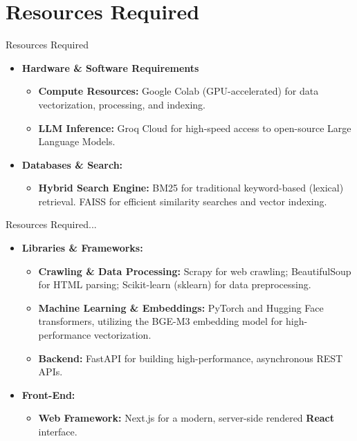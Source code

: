 \section{Resources Required}
\begin{frame}{Resources Required}
    \begin{itemize}
        \item \textbf{Hardware \& Software Requirements}

            \begin{itemize}
                \item \textbf{Compute Resources:} Google Colab (GPU-accelerated) for data vectorization, processing, and indexing.

                \item \textbf{LLM Inference:} Groq Cloud for high-speed access to open-source Large Language Models.
            \end{itemize}
        \item \textbf{Databases \& Search:}

        \begin{itemize}

            \item \textbf{Hybrid Search Engine:} BM25 for traditional keyword-based (lexical) retrieval.
            FAISS for efficient similarity searches and vector indexing.
        \end{itemize}
    \end{itemize}
\end{frame}

\begin{frame}{Resources Required...}
    \begin{itemize}
        \item \textbf{Libraries \& Frameworks:} 

        \begin{itemize}
            \item \textbf{Crawling \& Data Processing:} Scrapy for web crawling; BeautifulSoup for HTML parsing; Scikit-learn (sklearn) for data preprocessing.
            \item \textbf{Machine Learning & Embeddings:} PyTorch and Hugging Face transformers, utilizing the BGE-M3 embedding model for high-performance vectorization.
            \item \textbf{Backend:} FastAPI for building high-performance, asynchronous REST APIs.
        \end{itemize}

        \item \textbf{Front-End:}
        \begin{itemize}
            \item \textbf{Web Framework:} Next.js for a modern, server-side rendered \textbf{React} interface.
        \end{itemize}
    \end{itemize}
\end{frame}